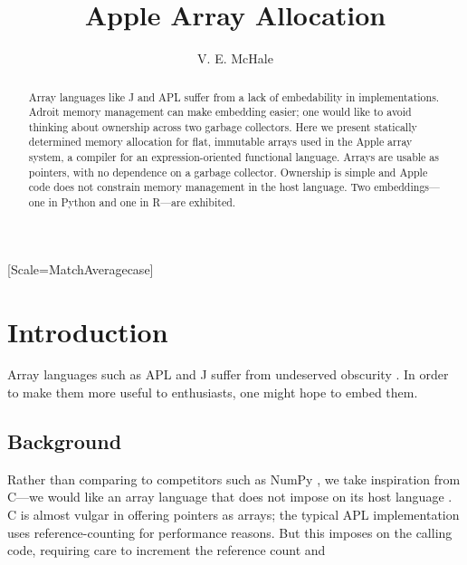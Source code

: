 \documentclass[acmsmall,screen,anonymous,nonacm]{acmart}
\begin{document}
\setmonofont{Jet Brains Mono}[Scale=MatchAveragecase]



\begin{abstract}
    Array languages like J and APL suffer from a lack of embedability in implementations. Adroit memory management can make embedding easier; one would like to avoid thinking about ownership across two garbage collectors.
    Here we present statically determined memory allocation for flat, immutable arrays used in the Apple array system, a compiler for an expression-oriented functional language.
    Arrays are usable as pointers, with no dependence on a garbage collector.
    Ownership is simple and Apple code does not constrain memory management in the host language.
    Two embeddings---one in Python and one in R---are exhibited.
\end{abstract}

\title{Apple Array Allocation}
\author{V. E. McHale}
\maketitle

\section{Introduction}

Array languages such as APL and J suffer from undeserved obscurity \cite{hsu2023}. In order to make them more useful to enthusiasts, one might hope to embed them. %

\subsection{Background}

Rather than comparing to competitors such as NumPy \cite{harris2020}, we take inspiration from C---we would like an array language that does not impose on its host language \cite{kell2017}.
C is almost vulgar in offering pointers as arrays; the typical APL implementation uses reference-counting \cite[p.~47]{hui2020} for performance reasons.
But this imposes on the calling code, requiring care to increment the reference count and %
\end{document}
